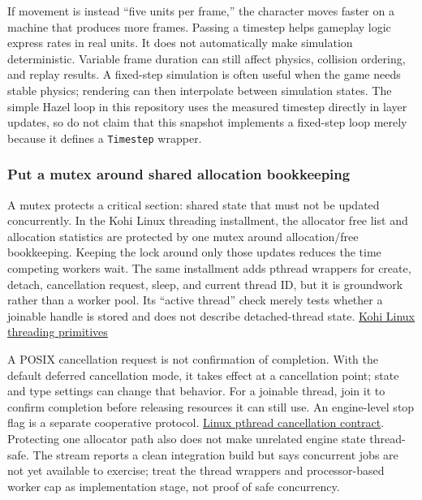 If movement is instead ``five units per frame,'' the character moves faster on a machine that produces more frames. Passing a timestep helps gameplay logic express rates in real units. It does not automatically make simulation deterministic. Variable frame duration can still affect physics, collision ordering, and replay results. A fixed-step simulation is often useful when the game needs stable physics; rendering can then interpolate between simulation states. The simple Hazel loop in this repository uses the measured timestep directly in layer updates, so do not claim that this snapshot implements a fixed-step loop merely because it defines a \texttt{Timestep} wrapper.

\subsubsection{Put a mutex around shared allocation bookkeeping}\label{05-engine-i-ch013-put-a-mutex-around-shared-allocation-bookkeeping}

A mutex protects a critical section: shared state that must not be updated concurrently. In the Kohi Linux threading installment, the allocator free list and allocation statistics are protected by one mutex around allocation/free bookkeeping. Keeping the lock around only those updates reduces the time competing workers wait. The same installment adds pthread wrappers for create, detach, cancellation request, sleep, and current thread ID, but it is groundwork rather than a worker pool. Its ``active thread'' check merely tests whether a joinable handle is stored and does not describe detached-thread state. \href{https://www.youtube.com/watch?v=NxtqrN6Jw-4}{Kohi Linux threading primitives}

A POSIX cancellation request is not confirmation of completion. With the default deferred cancellation mode, it takes effect at a cancellation point; state and type settings can change that behavior. For a joinable thread, join it to confirm completion before releasing resources it can still use. An engine-level stop flag is a separate cooperative protocol. \href{https://man7.org/linux/man-pages/man3/pthread_cancel.3.html}{Linux pthread cancellation contract}. Protecting one allocator path also does not make unrelated engine state thread-safe. The stream reports a clean integration build but says concurrent jobs are not yet available to exercise; treat the thread wrappers and processor-based worker cap as implementation stage, not proof of safe concurrency.

